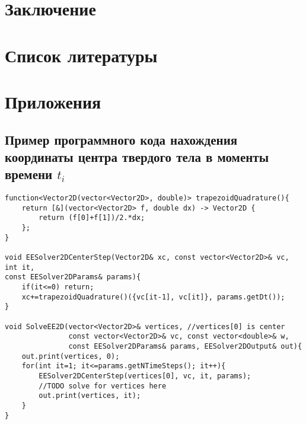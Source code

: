 \documentclass[12pt,a4paper]{article}
\begin{document}
\section{Заключение}

\section{Список литературы}

\section{Приложения}
\subsection{Пример программного кода нахождения координаты центра твердого тела в моменты времени $t_i$}
\label{code:xc}
\begin{lstlisting}
function<Vector2D(vector<Vector2D>, double)> trapezoidQuadrature(){
    return [&](vector<Vector2D> f, double dx) -> Vector2D {
        return (f[0]+f[1])/2.*dx;
    };
}

void EESolver2DCenterStep(Vector2D& xc, const vector<Vector2D>& vc, int it,
const EESolver2DParams& params){
    if(it<=0) return;
    xc+=trapezoidQuadrature()({vc[it-1], vc[it]}, params.getDt());
}

void SolveEE2D(vector<Vector2D>& vertices, //vertices[0] is center
               const vector<Vector2D>& vc, const vector<double>& w,
               const EESolver2DParams& params, EESolver2DOutput& out){
    out.print(vertices, 0);
    for(int it=1; it<=params.getNTimeSteps(); it++){
        EESolver2DCenterStep(vertices[0], vc, it, params);
        //TODO solve for vertices here
        out.print(vertices, it);
    }
}
\end{lstlisting}
\end{document}
